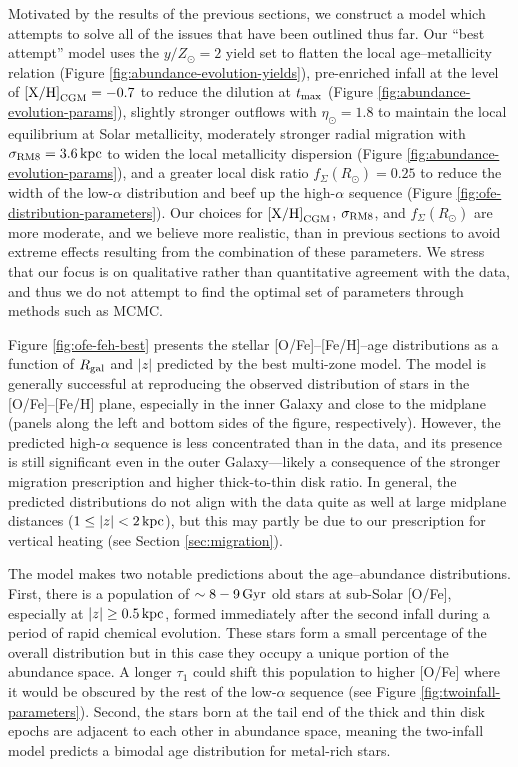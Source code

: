 \documentclass[twocolumn,twocolappendix,linenumbers]{aastex631}
\newcommand{\mathXH}{{\rm [X/H]}}
\newcommand{\yZ}[1]{$y/Z_\odot=#1$}
\newcommand{\kpc}{\,{\rm kpc}}
\newcommand{\Gyr}{\,{\rm Gyr}}
\begin{document}
Motivated by the results of the previous sections, we construct a model which attempts to solve all of the issues that have been outlined thus far. Our ``best attempt'' model uses the \yZ{2} yield set to flatten the local age--metallicity relation (Figure \ref{fig:abundance-evolution-yields}), pre-enriched infall at the level of $\mathXH_{\rm CGM}=-0.7$ to reduce the dilution at $t_{\rm max}$ (Figure \ref{fig:abundance-evolution-params}), slightly stronger outflows with $\eta_\odot=1.8$ to maintain the local equilibrium at Solar metallicity, moderately stronger radial migration with $\sigma_{\rm RM8}=3.6\kpc$ to widen the local metallicity dispersion (Figure \ref{fig:abundance-evolution-params}), and a greater local disk ratio $f_\Sigma(R_\odot)=0.25$ to reduce the width of the low-$\alpha$ distribution and beef up the high-$\alpha$ sequence (Figure \ref{fig:ofe-distribution-parameters}). Our choices for $\mathXH_{\rm CGM}$, $\sigma_{\rm RM8}$, and $f_\Sigma(R_\odot)$ are more moderate, and we believe more realistic, than in previous sections to avoid extreme effects resulting from the combination of these parameters. We stress that our focus is on qualitative rather than quantitative agreement with the data, and thus we do not attempt to find the optimal set of parameters through methods such as MCMC.

Figure \ref{fig:ofe-feh-best} presents the stellar [O/Fe]--[Fe/H]--age distributions as a function of $R_{\rm gal}$ and $|z|$ predicted by the best multi-zone model. The model is generally successful at reproducing the observed distribution of stars in the [O/Fe]--[Fe/H] plane, especially in the inner Galaxy and close to the midplane (panels along the left and bottom sides of the figure, respectively). However, the predicted high-$\alpha$ sequence is less concentrated than in the data, and its presence is still significant even in the outer Galaxy---likely a consequence of the stronger migration prescription and higher thick-to-thin disk ratio. In general, the predicted distributions do not align with the data quite as well at large midplane distances ($1\leq|z|<2\kpc$), but this may partly be due to our prescription for vertical heating (see Section \ref{sec:migration}).

The model makes two notable predictions about the age--abundance distributions. First, there is a population of $\sim8-9\Gyr$ old stars at sub-Solar [O/Fe], especially at $|z|\ge0.5\kpc$, formed immediately after the second infall during a period of rapid chemical evolution. These stars form a small percentage of the overall distribution \citep[see also Figure 11 from][]{spitoni_remind_2024} but in this case they occupy a unique portion of the abundance space. A longer $\tau_1$ could shift this population to higher [O/Fe] where it would be obscured by the rest of the low-$\alpha$ sequence (see Figure \ref{fig:twoinfall-parameters}). Second, the stars born at the tail end of the thick and thin disk epochs are adjacent to each other in abundance space, meaning the two-infall model predicts a bimodal age distribution for metal-rich stars.
\end{document}
